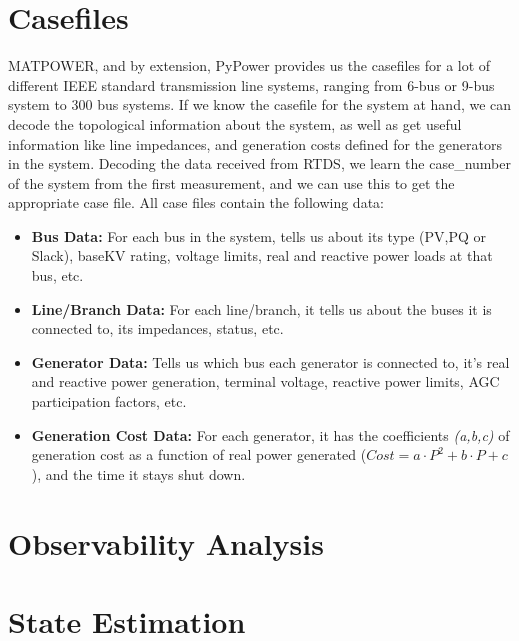 \section{Casefiles}
MATPOWER, and by extension, PyPower provides us the casefiles for a lot of different IEEE standard transmission line systems, ranging from 6-bus or 9-bus system to 300 bus systems. If we know the casefile for the system at hand, we can decode the topological information about the system, as well as get useful information like line impedances, and generation costs defined for the generators in the system. Decoding the data received from RTDS, we learn the case\_number of the system from the first measurement, and we can use this to get the appropriate case file.
All case files contain the following data:
\begin{itemize}
\item \textbf{Bus Data:} For each bus in the system, tells us about its type (PV,PQ or Slack), baseKV rating, voltage limits, real and reactive power loads at that bus, etc.
\item \textbf{Line/Branch Data:} For each line/branch, it tells us about the buses it is connected to, its impedances, status, etc.
\item \textbf{Generator Data:} Tells us which bus each generator is connected to, it's real and reactive power generation, terminal voltage, reactive power limits, AGC participation factors, etc.
\item \textbf{Generation Cost Data:} For each generator, it has the coefficients \emph{(a,b,c)} of generation cost as a function of real power generated ($Cost=a\cdot P^2+b\cdot P+c$), and the time it stays shut down.
\end{itemize}
\section{Observability Analysis}

\section{State Estimation}
